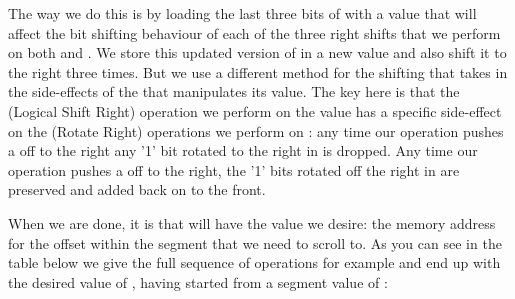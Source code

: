 The way we do this is by loading the last three bits of  with a value that will affect the bit shifting behaviour
of each of the three right shifts that we perform on both  and . We store this updated version of
 in a new value  and also shift it to the right three times. But we use a different method
for the shifting that takes in the side-effects of the  that manipulates its value. The key here is that the 
(Logical Shift Right) operation we perform on the  value has a specific side-effect on the  (Rotate Right) operations
we perform on : any time our  operation pushes a  off to the right any '1' bit rotated to the
right in  is dropped. Any time our  operation pushes a  off to the right, the '1' bits rotated
off the right in  are preserved and added back on to the front.

When we are done, it is  that will have the value we desire: the memory address for the offset within the
segment that we need to scroll to. As you can see in the table below we give the full sequence of operations for example and end
up with the desired value of , having started from a segment value of :

